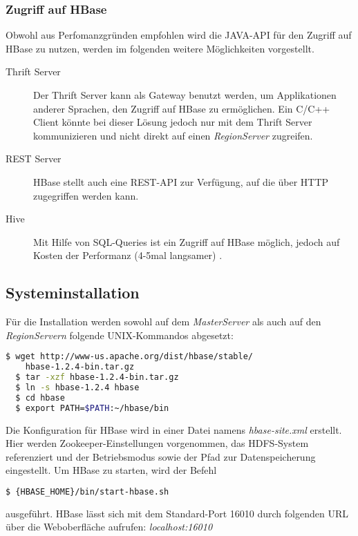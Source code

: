 \subsubsection{Zugriff auf HBase}
Obwohl aus Perfomanzgründen empfohlen wird die JAVA-API für den Zugriff auf HBase zu nutzen, werden im folgenden weitere Möglichkeiten vorgestellt.
\begin{description}
\item[Thrift Server]
Der Thrift Server kann als Gateway benutzt werden, um Applikationen  anderer Sprachen, den Zugriff auf HBase zu ermöglichen. Ein C/C++ Client könnte bei dieser Lösung jedoch nur mit dem Thrift Server kommunizieren und nicht direkt auf einen \textit{RegionServer} zugreifen.

\item[REST Server]
HBase stellt auch eine REST-API zur Verfügung, auf die über HTTP zugegriffen werden kann.

\item[Hive] Mit Hilfe von SQL-Queries ist ein Zugriff auf HBase möglich, jedoch auf Kosten der Performanz (4-5mal langsamer) \cite{clo11}.
\end{description}


\subsection{Systeminstallation} %
Für die Installation werden sowohl auf dem  \textit{MasterServer} als auch auf den \textit{RegionServern} folgende UNIX-Kommandos abgesetzt:
\noindent 
\begin{lstlisting}[language=bash]
  $ wget http://www-us.apache.org/dist/hbase/stable/
    hbase-1.2.4-bin.tar.gz
  $ tar -xzf hbase-1.2.4-bin.tar.gz
  $ ln -s hbase-1.2.4 hbase
  $ cd hbase
  $ export PATH=$PATH:~/hbase/bin
\end{lstlisting}

Die Konfiguration für HBase wird in einer Datei namens \textit{hbase-site.xml} erstellt. Hier werden Zookeeper-Einstellungen vorgenommen, das HDFS-System referenziert und der Betriebsmodus sowie der Pfad zur Datenspeicherung eingestellt.
Um HBase zu starten, wird der Befehl 
\noindent 
\begin{lstlisting}[language=bash]
  $ {HBASE_HOME}/bin/start-hbase.sh 
\end{lstlisting}
ausgeführt. HBase lässt sich mit dem Standard-Port 16010 durch folgenden \ac{URL} über die Weboberfläche aufrufen: \textit{localhost:16010}

